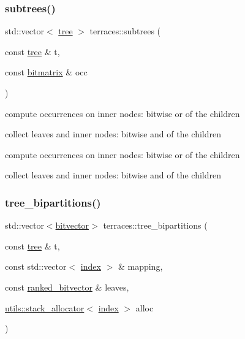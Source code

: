 \subsubsection{\texorpdfstring{subtrees()}{subtrees()}}
{\footnotesize\ttfamily std\+::vector$<$ \hyperlink{namespaceterraces_a07aaf7feec4a22c6cdefc14c5a81bdd0}{tree} $>$ terraces\+::subtrees (\begin{DoxyParamCaption}\item[{const \hyperlink{namespaceterraces_a07aaf7feec4a22c6cdefc14c5a81bdd0}{tree} \&}]{t,  }\item[{const \hyperlink{classterraces_1_1bitmatrix}{bitmatrix} \&}]{occ }\end{DoxyParamCaption})}

compute occurrences on inner nodes\+: bitwise or of the children

collect leaves and inner nodes\+: bitwise and of the children

compute occurrences on inner nodes\+: bitwise or of the children

collect leaves and inner nodes\+: bitwise and of the children \mbox{\label{namespaceterraces_a34db8e988e2845af99b6b228924a5f56}} 
\subsubsection{\texorpdfstring{tree\+\_\+bipartitions()}{tree\_bipartitions()}}
{\footnotesize\ttfamily std\+::vector$<$\hyperlink{namespaceterraces_a1b526fb554dff829f7ad51eb21d5ed06}{bitvector}$>$ terraces\+::tree\+\_\+bipartitions (\begin{DoxyParamCaption}\item[{const \hyperlink{namespaceterraces_a07aaf7feec4a22c6cdefc14c5a81bdd0}{tree} \&}]{t,  }\item[{const std\+::vector$<$ \hyperlink{namespaceterraces_adbc33ccb543d1634e96d0eb02e472c77}{index} $>$ \&}]{mapping,  }\item[{const \hyperlink{namespaceterraces_acc45ec9c561024c50ecbce5b6738ba08}{ranked\+\_\+bitvector} \&}]{leaves,  }\item[{\hyperlink{classterraces_1_1utils_1_1stack__allocator}{utils\+::stack\+\_\+allocator}$<$ \hyperlink{namespaceterraces_adbc33ccb543d1634e96d0eb02e472c77}{index} $>$}]{alloc }\end{DoxyParamCaption})}

